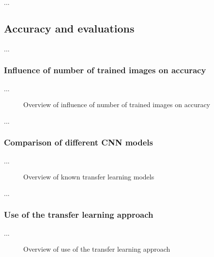 \documentclass[10pt]{article}
\begin{document}
			\noindent ...
		
		\pagebreak
	
		\subsection{Accuracy and evaluations}

			\noindent ...

			\subsubsection{Influence of number of trained images on accuracy}
	
				\noindent ...

				\begin{figure}[H]
					\begin{center}
						
					\end{center}
					\caption{Overview of influence of number of trained images on accuracy}
					\label{fig:evaluation_number_train_files}
				\end{figure}

				\noindent ...
		
			\subsubsection{Comparison of different CNN models}

				\noindent ...

				\begin{figure}[H]
					\begin{center}
						
					\end{center}
					\caption{Overview of known transfer learning models}
					\label{fig:evaluation_different_models}
				\end{figure}

				\noindent ...
		
			\subsubsection{Use of the transfer learning approach}
			\label{sec:section_use_of_the_transfer_learning_approach}
	
				\noindent ...

				\begin{figure}[H]
					\begin{center}
						
					\end{center}
					\caption{Overview of use of the transfer learning approach}
					\label{fig:evaluation_transfer_learning}
				\end{figure}
\end{document}
